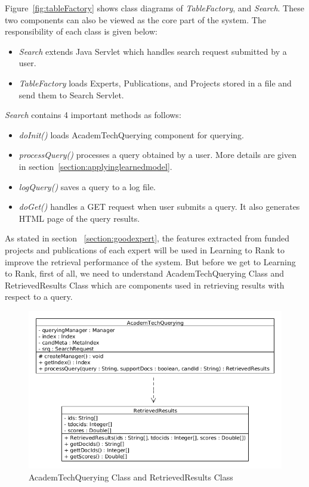 Figure~\ref{fig:tableFactory} shows class diagrams of \textit{TableFactory}, and \textit{Search}. These two components can also be viewed as the core
part of the system. The responsibility of each class is given below:
\begin{itemize}
 \item \textit{Search} extends Java Servlet which handles search request submitted by a user.
 \item \textit{TableFactory} loads Experts, Publications, and Projects stored in a file and send them to Search Servlet.
\end{itemize}

\textit{Search} contains 4 important methods as follows: 
\begin{itemize}
 \item \textit{doInit()} loads AcademTechQuerying component for querying.
 \item \textit{processQuery()} processes a query obtained by a user. More details are given in section~\ref{section:applyinglearnedmodel}.
 \item \textit{logQuery()} saves a query to a log file.
 \item \textit{doGet()} handles a GET request when user submits a query. It also generates HTML page of the query results.
\end{itemize}

As stated in section ~\ref{section:goodexpert}, the features extracted from funded projects and publications of each expert will be used in Learning to Rank
to improve the retrieval performance of the system. But before we get to Learning to Rank, first of all, we need to understand
AcademTechQuerying Class and RetrievedResults Class which are components used in retrieving results with respect to a query. 
\begin{figure}
\centering
\includegraphics[scale=0.4]{./figures/AcademTechQuerying.png}
\caption{AcademTechQuerying Class and RetrievedResults Class} \label{fig:AcademTechQuerying} 
\end{figure}



